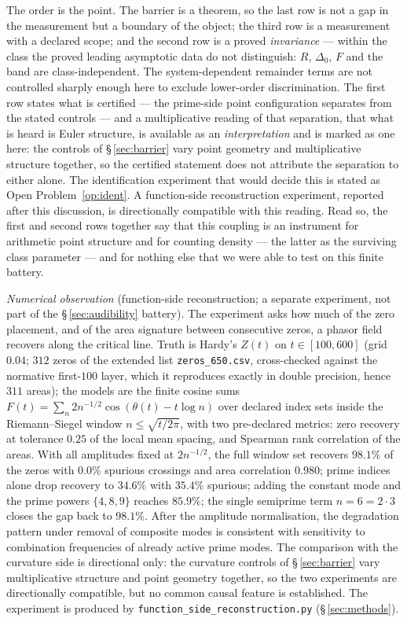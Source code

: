 \documentclass[11pt]{article}
\begin{document}
The order is the point. The barrier is a theorem, so the last row is not a
gap in the measurement but a boundary of the object; the third row is a
measurement with a declared scope; and the second row is a proved
\emph{invariance} --- within the class the proved leading asymptotic data do not distinguish:
$R$, $\Delta_0$, $F$ and the band are class-independent. The
system-dependent remainder terms are not controlled sharply enough here to
exclude lower-order discrimination. The first row states what is certified ---
the prime-side point configuration separates from the stated controls --- and
a multiplicative reading of that separation, that what is heard is Euler
structure, is available as an \emph{interpretation} and is marked as one here:
the controls of \S\,\ref{sec:barrier} vary point geometry and multiplicative
structure together, so the certified statement does not attribute the
separation to either alone. The identification experiment that would decide
this is stated as Open Problem~\ref{op:ident}. A function-side
reconstruction experiment, reported after this discussion, is directionally
compatible with this reading. Read so, the first and
second rows together say that this coupling is an instrument for arithmetic
point structure and for counting density --- the latter as the surviving
class parameter --- and for nothing else that we were able to test on this
finite battery.

\emph{Numerical observation} (function-side reconstruction; a separate
experiment, not part of the \S\,\ref{sec:audibility} battery). The
experiment asks how much of the zero placement, and of the area signature
between consecutive zeros, a phasor field recovers along the critical line.
Truth is Hardy's $Z(t)$ on $t\in[100,600]$ (grid $0.04$; $312$ zeros of the
extended list \texttt{zeros\_650.csv}, cross-checked against the normative
first-$100$ layer, which it reproduces exactly in double precision, hence
$311$ areas); the models are the finite cosine sums
$F(t)=\sum_n 2n^{-1/2}\cos(\theta(t)-t\log n)$ over declared index sets
inside the Riemann--Siegel window $n\le\sqrt{t/2\pi}$, with two
pre-declared metrics: zero recovery at tolerance $0.25$ of the local mean
spacing, and Spearman rank correlation of the areas. With all amplitudes
fixed at $2n^{-1/2}$, the full window set recovers $98.1\%$ of the zeros
with $0.0\%$ spurious crossings and area correlation $0.980$; prime indices
alone drop recovery to $34.6\%$ with $35.4\%$ spurious; adding the constant
mode and the prime powers $\{4,8,9\}$ reaches $85.9\%$; the single
semiprime term $n=6=2\cdot3$ closes the gap back to $98.1\%$. After the
amplitude normalisation, the degradation pattern under removal of composite
modes is consistent with sensitivity to combination frequencies of already
active prime modes. The comparison with the curvature side is directional
only: the curvature controls of \S\,\ref{sec:barrier} vary multiplicative
structure and point geometry together, so the two experiments are
directionally compatible, but no common causal feature is established. The
experiment is produced by \texttt{function\_side\_reconstruction.py} (\S\,\ref{sec:methods}).
\end{document}
